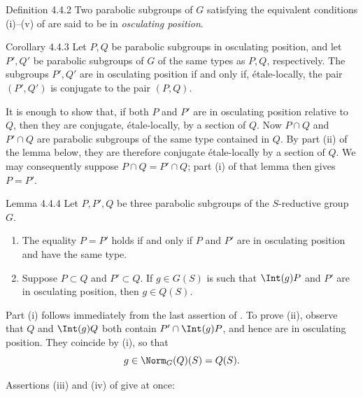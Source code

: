 \begin{sgastatement}{Definition 4.4.2}
Two parabolic subgroups of \(G\) satisfying the equivalent conditions
\textup{(i)}--\textup{(v)} of  are said to be in
\emph{osculating position}.
\end{sgastatement}

\begin{sgastatement}{Corollary 4.4.3}
Let \(P,Q\) be parabolic subgroups in osculating position, and let
\(P',Q'\) be parabolic subgroups of \(G\) of the same types as \(P,Q\),
respectively.  The subgroups \(P',Q'\) are in osculating position if
and only if, étale-locally, the pair \((P',Q')\) is conjugate to the
pair \((P,Q)\).
\end{sgastatement}

It is enough to show that, if both \(P\) and \(P'\) are in osculating
position relative to \(Q\), then they are conjugate, étale-locally,
by a section of \(Q\).  Now \(P\cap Q\) and \(P'\cap Q\) are parabolic
subgroups of the same type contained in \(Q\).  By part \textup{(ii)}
of the lemma below, they are therefore conjugate étale-locally by a
section of \(Q\).  We may consequently suppose
\(P\cap Q=P'\cap Q\); part \textup{(i)} of that lemma then gives
\(P=P'\).

\begin{sgastatement}{Lemma 4.4.4}
Let \(P,P',Q\) be three parabolic subgroups of the \(S\)-reductive
group \(G\).
\begin{enumerate}[label=\textup{(\roman*)}]
\item The equality \(P=P'\) holds if and only if \(P\) and \(P'\) are
in osculating position and have the same type.
\item Suppose \(P\subset Q\) and \(P'\subset Q\).  If \(g\in G(S)\)
is such that \(\Int(g)P\) and \(P'\) are in osculating position, then
\(g\in Q(S)\).
\end{enumerate}
\end{sgastatement}

Part \textup{(i)} follows immediately from the last assertion of
.  To prove \textup{(ii)}, observe that \(Q\) and \(\Int(g)Q\)
both contain \(P'\cap\Int(g)P\), and hence are in osculating position.
They coincide by \textup{(i)}, so that
\[
 g\in\Norm_G(Q)(S)=Q(S).
\]

Assertions \textup{(iii)} and \textup{(iv)} of  give
at once:

